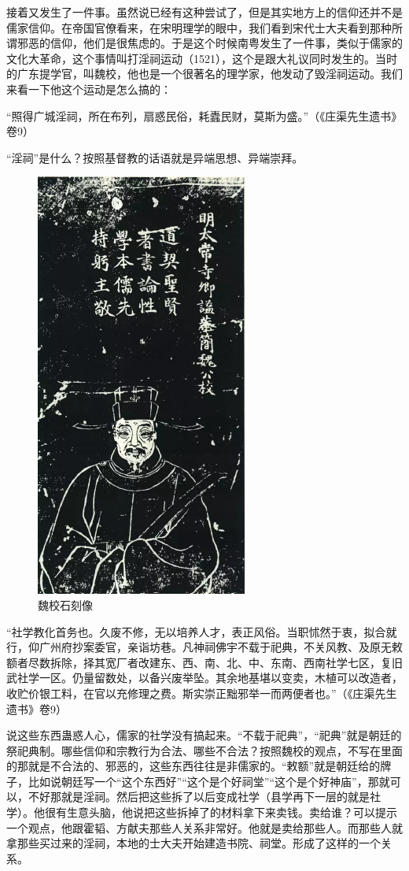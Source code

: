 接着又发生了一件事。虽然说已经有这种尝试了，但是其实地方上的信仰还并不是儒家信仰。在帝国官僚看来，在宋明理学的眼中，我们看到宋代士大夫看到那种所谓邪恶的信仰，他们是很焦虑的。于是这个时候南粤发生了一件事，类似于儒家的文化大革命，这个事情叫打淫祠运动（1521），这个是跟大礼议同时发生的。当时的广东提学官，叫魏校，他也是一个很著名的理学家，他发动了毁淫祠运动。我们来看一下他这个运动是怎么搞的：

“照得广城淫祠，所在布列，扇惑民俗，耗蠹民财，莫斯为盛。”（《庄渠先生遗书》卷9）

“淫祠”是什么？按照基督教的话语就是异端思想、异端崇拜。

\begin{figure}
	\centering
	\includegraphics[height=\textheight]{images/image-55}
	\caption{魏校石刻像}
\end{figure}

“社学教化首务也。久废不修，无以培养人才，表正风俗。当职怵然于衷，拟合就行，仰广州府抄案委官，亲诣坊巷。凡神祠佛宇不载于祀典，不关风教、及原无敕额者尽数拆除，择其宽厂者改建东、西、南、北、中、东南、西南社学七区，复旧武社学一区。仍量留数处，以备兴废举坠。其余地基堪以变卖，木植可以改造者，收贮价银工料，在官以充修理之费。斯实崇正黜邪举一而两便者也。”（《庄渠先生遗书》卷9）

说这些东西蛊惑人心，儒家的社学没有搞起来。“不载于祀典”，“祀典”就是朝廷的祭祀典制。哪些信仰和宗教行为合法、哪些不合法？按照魏校的观点，不写在里面的那就是不合法的、邪恶的，这些东西往往是非儒家的。“敕额”就是朝廷给的牌子，比如说朝廷写一个“这个东西好”“这个是个好祠堂”“这个是个好神庙”，那就可以，不好那就是淫祠。然后把这些拆了以后变成社学（县学再下一层的就是社学）。他很有生意头脑，他说把这些拆掉了的材料拿下来卖钱。卖给谁？可以提示一个观点，他跟霍韬、方献夫那些人关系非常好。他就是卖给那些人。而那些人就拿那些买过来的淫祠，本地的士大夫开始建造书院、祠堂。形成了这样的一个关系。

